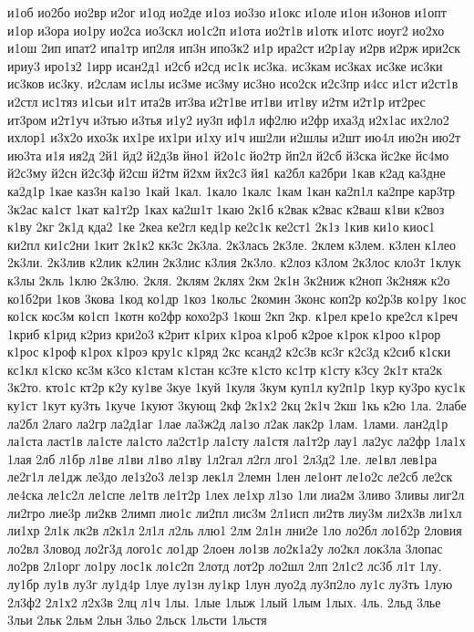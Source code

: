 {и1об
ио2бо
ио2вр
и2ог
и1од
ио2де
и1оз
ио3зо
и1окс
и1оле
и1он
и3онов
и1опт
и1ор
и3ора
ио1ру
ио2са
ио3скл
ио1с2п
и1ота
ио2т1в
и1отк
и1отс
иоуг2
ио2хо
и1ош
2ип
ипат2
ипа1тр
ип2ля
ип3н
ипо3к2
и1р
ира2ст
и2р1ау
и2рв
и2рж
ири2ск
ириу3
иро1з2
1ирр
исан2д1
и2сб
и2сд
ис1к
ис3ка.
ис3кам
ис3ках
ис3ке
ис3ки
ис3ков
ис3ку.
и2слам
ис1лы
ис3ме
ис3му
ис3но
исо2ск
и2с3пр
и4сс
и1ст
и2ст1в
и2стл
ис1тяз
и1сьи
и1т
ита2в
ит3ва
и2т1ве
ит1ви
ит1ву
и2тм
и2т1р
ит2рес
ит3ром
и2т1уч
и3тью
и3тья
и1у2
иу3п
иф1л
иф2лю
и2фр
иха3д
и2х1ас
их2ло2
ихлор1
и3х2о
ихо3к
их1ре
их1ри
и1ху
и1ч
иш2ли
и2шлы
и2шт
ию4л
ию2н
ию2т
ию3та
и1я
ия2д
2й1
йд2
й2д3в
йно1
й2о1с
йо2тр
йп2л
й2сб
й3ска
йс2ке
йс4мо
й2с3му
й2сн
й2с3ф
й2сш
й2тм
й2хм
йх2с3
йя1
ка2бл
ка2бри
1кав
к2ад
ка3дне
ка2д1р
1кае
каз3н
ка1зо
1кай
1кал.
1кало
1калс
1кам
1кан
ка2п1л
ка2пре
кар3тр
3к2ас
ка1ст
1кат
ка1т2р
1ках
ка2ш1т
1каю
2к1б
к2вак
к2вас
к2ваш
к1ви
к2воз
к1ву
2кг
2к1д
кда2
1ке
2кеа
ке2гл
кед1р
ке2с1к
ке2ст1
2к1з
1кив
ки1о
киос1
ки2пл
ки1с2ни
1кит
2к1к2
кк3с
2к3ла.
2к3лась
2к3ле.
2клем
к3лем.
к3лен
к1лео
2к3ли.
2к3лив
к2лик
к2лин
2к3лис
к3лия
2к3ло.
к2лоз
к3лом
2к3лос
кло3т
1клук
к3лы
2кль
1клю
2к3лю.
2кля.
2клям
2клях
2км
2к1н
3к2ниж
к2ноп
3к2няж
к2о
ко1б2ри
1ков
3кова
1код
ко1др
1коз
1кольс
2комин
3конс
коп2р
ко2р3в
ко1ру
1кос
ко1ск
кос3м
ко1сп
1котн
ко2фр
кохо2р3
1кош
2кп
2кр.
к1рел
кре1о
кре2сл
к1реч
1криб
к1рид
к2риз
кри2о3
к2рит
к1рих
к1роа
к1роб
к2рое
к1рок
к1роо
к1рор
к1рос
к1роф
к1рох
к1роэ
кру1с
к1ряд
2кс
ксанд2
к2с3в
кс3г
к2с3д
к2сиб
к1ски
кс1кл
к1ско
кс3м
к3со
к1стам
к1стан
кс3те
к1сто
кс1тр
к1сту
к3су
2к1т
кта2к
3к2то.
кто1с
кт2р
к2у
ку1ве
3куе
1куй
1куля
3кум
куп1л
ку2п1р
1кур
ку3ро
кус1к
ку1ст
1кут
ку3ть
1куче
1куют
3кующ
2кф
2к1х2
2кц
2к1ч
2кш
1кь
к2ю
1ла.
2лабе
ла2бл
2лаго
ла2гр
ла2д1аг
1лае
ла3ж2д
ла1зо
л2ак
лак2р
1лам.
1лами.
лан2д1р
ла1ста
ласт1в
ла1сте
ла1сто
ла2ст1р
ла1сту
ла1стя
ла1т2р
лау1
ла2ус
ла2фр
1ла1х
1лая
2лб
л1бр
л1ве
л1ви
л1во
л1ву
1л2гал
л2гл
лго1
2л3д2
1ле.
ле1вл
лев1ра
ле2г1л
ле1дж
ле3до
ле1з2о3
ле1зр
лек1л
2лемн
1лен
ле1онт
ле1о2с
ле2сб
ле2ск
ле4ска
ле1с2л
ле1спе
ле1тв
ле1т2р
1лех
ле1хр
л1зо
1ли
лиа2м
3ливо
3ливы
лиг2л
ли2гро
лие3р
ли2кв
2лимп
лио1с
ли2пл
лис3м
2л1исп
ли2тв
лиу3м
ли2х3в
ли1хл
ли1хр
2л1к
лк2в
л2к1л
2л1л
л2ль
ллю1
2лм
2л1н
лни2е
1ло
ло2бл
ло1б2р
2ловия
ло2вл
3ловод
ло2г3д
лого1с
ло1др
2лоен
ло1зв
ло2к1а2у
ло2кл
лок3ла
3лопас
ло2рв
2л1орг
ло1ру
лос1к
ло1с2п
2лотд
лот2р
ло2шл
2лп
2л1с2
лс3б
л1т
1лу.
лу1бр
лу1в
лу3г
лу1д4р
1луе
лу1зн
лу1кр
1лун
луо2д
лу3п2ло
лу1с
лу3ть
1лую
2л3ф2
2л1х2
л2х3в
2лц
л1ч
1лы.
1лые
1лыж
1лый
1лым
1лых.
4ль.
2льд
3лье
3льи
2льк
2льм
2льн
3льо
2льск
1льсти
1льстя
}
